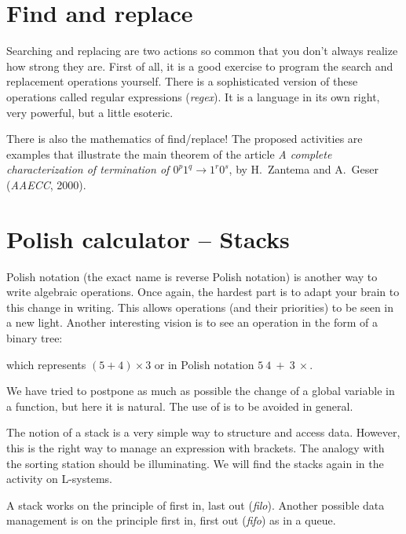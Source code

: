 \documentclass[11pt,class=report,crop=false]{standalone}
\begin{document}
\section{Find and replace}

Searching and replacing are two actions so common that you don't always realize how strong they are.
First of all, it is a good exercise to program the search and replacement operations yourself. There is a sophisticated version of these operations called regular expressions (\emph{regex}). It is a language in its own right, very powerful, but a little esoteric.

There is also the mathematics of \og{}find/replace\fg{}! The proposed activities are examples that illustrate the main theorem of the article \emph{A complete characterization of termination of $0^p1^q \rightarrow 1^r0^s$}, by H.~Zantema and A.~Geser (\emph{AAECC}, 2000).



\section{Polish calculator -- Stacks}

Polish notation (the exact name is \og{}reverse Polish notation\fg{}) is another way to write algebraic operations. Once again, the hardest part is to adapt your brain to this change in writing. This allows operations (and their priorities) to be seen in a new light. Another interesting vision is to see an operation in the form of a binary tree:

which represents $(5 + 4) \times 3$ or in Polish notation $5 \ 4 \ +\  3 \ \times$.

We have tried to postpone as much as possible the change of a global variable in a function, but here it is natural. The use of  is to be avoided in general.

The notion of a stack is a very simple way to structure and access data.
However, this is the right way to manage an expression with brackets. The analogy with the sorting station should be illuminating. 
We will find the stacks again in the activity on L-systems.


A stack works on the principle of \og{}first in, last out\fg{} (\emph{filo}). Another possible data management is on the principle \og{}first in, first out\fg{} (\emph{fifo}) as in a queue.
\end{document}
